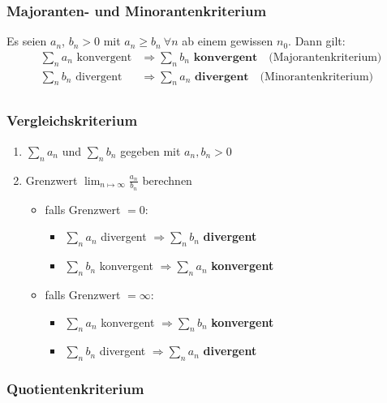 \subsubsection*{Majoranten- und Minorantenkriterium}

Es seien $a_n$, $b_n > 0$ mit $a_n \geq b_n\ \forall n$ ab einem gewissen $n_0$. Dann gilt: 
\begin{equation*}
\begin{split}
	\sum_n a_n \text{ konvergent} & \Rightarrow \sum_n b_n \textbf{ konvergent}\quad \text{(Majorantenkriterium)} \\
	\sum_n b_n \text{ divergent} & \Rightarrow \sum_n a_n \textbf{ divergent}\quad \text{(Minorantenkriterium)} \\
\end{split}
\end{equation*}

\subsubsection*{Vergleichskriterium}

\begin{enumerate}
	\item $\sum_n a_n$ und $\sum_n b_n$ gegeben mit $a_n,b_n > 0$
	\item Grenzwert $\lim_{n\mapsto\infty} \frac{a_n}{b_n}$ berechnen
	\begin{itemize}
		\item falls Grenzwert $= 0$:
		\begin{itemize}
			\item $\sum_n a_n$ divergent $\Rightarrow \sum_n b_n$ \textbf{divergent}
			\item $\sum_n b_n$ konvergent $\Rightarrow \sum_n a_n$ \textbf{konvergent}
		\end{itemize} 
		\item falls Grenzwert $= \infty$:
		\begin{itemize}
			\item $\sum_n a_n$ konvergent $\Rightarrow \sum_n b_n$ \textbf{konvergent}
			\item $\sum_n b_n$ divergent $\Rightarrow \sum_n a_n$ \textbf{divergent}
		\end{itemize} 
	\end{itemize}
\end{enumerate}

\subsubsection*{Quotientenkriterium}


